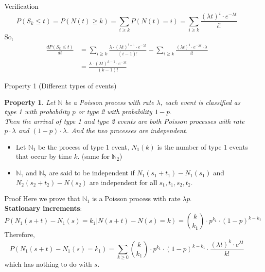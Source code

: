 \documentclass[mathserif]{beamer}
\newtheorem{pty}{Property}
\begin{document}
\begin{frame}{Verification}
\[
P(S_k \leq t) = P(N(t) \geq k) = \sum_{i\geq k} P(N(t) = i) = \sum_{i\geq k} \frac{(\lambda t)^i \cdot e^{-\lambda t}}{i!}
\]
So,
\begin{align*}
\frac{d P(S_k \leq t)}{dt} & = \sum_{i\geq k}\frac{\lambda\cdot(\lambda t)^{i-1}\cdot e^{-\lambda t}}{(i-1)!}
	- \sum_{i\geq k}\frac{(\lambda t)^i \cdot e^{-\lambda t} \cdot \lambda}{i!} \\
& = \frac{\lambda\cdot (\lambda t)^{k-1}\cdot e^{-\lambda t}}{(k-1)!}
\end{align*}
\end{frame}

\begin{frame}{Property 1 (Different types of events)}
\begin{pty}
Let $\mathbb{N}$ be a Poisson process with rate $\lambda$, 
each event is classified as type 1 with probability $p$ or type 2 with probability $1-p$.\\
Then the arrival of type 1 and type 2 events are both Poisson processes with rate $p\cdot\lambda$ and $(1-p)\cdot\lambda$.
And the two processes are independent.
\end{pty}
\begin{itemize}
\item Let $\mathbb{N}_1$ be the process of type 1 event, 
$N_1(k)$ is the number of type 1 events that occur by time $k$. (same for $\mathbb{N}_2$)
\item $\mathbb{N}_1$ and $\mathbb{N}_2$ are said to be independent if $N_1(s_1+t_1) - N_1(s_1)$ and $N_2(s_2+t_2) - N(s_2)$ are independent for all $s_1, t_1, s_2, t_2$.
\end{itemize}
\end{frame}

\begin{frame}{Proof}
Here we prove that $\mathbb{N}_1$ is a Poisson process with rate $\lambda p$.\\
\vspace{\baselineskip}
\textbf{Stationary increments}:
\[
P(N_1(s+t) - N_1(s) = k_1 | N(s+t) - N(s) = k) = \binom{k}{k_1}\cdot p^{k_1}\cdot (1-p)^{k-k_1}
\]
Therefore,
\[
P(N_1(s+t) - N_1(s) = k_1) = \sum_{k\geq 0} \binom{k}{k_1}\cdot p^{k_1}\cdot (1-p)^{k-k_1}
	\cdot \frac{(\lambda t)^k\cdot e^{\lambda t}}{k!}
\]
which has nothing to do with $s$.
\end{frame}
\end{document}

